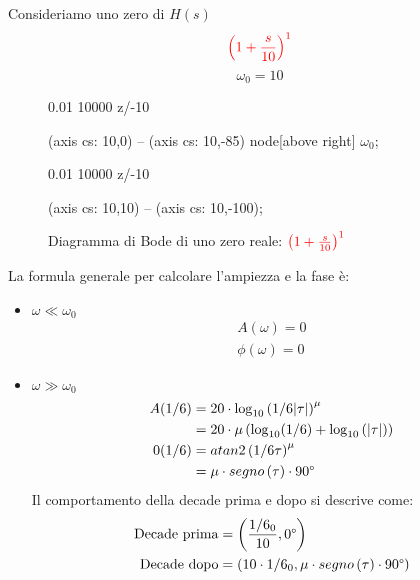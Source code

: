 \documentclass[a4paper]{article}
\begin{document}
\noindent
Consideriamo uno zero di \( H(s) \) 
\[
  \color{red} \left( 1 + \frac{s}{10} \right)^{1}
\] 
\[
\omega_0 = 10
\] 
\begin{figure}[H]
  \centering
  \begin{BodeMagPlot}[scale=1.5,ytick distance=20,ylabel={Ampiezza (dB)},xlabel={}] {0.01} {10000}
    {
      z/-10
    }

     (axis cs: 10,0) -- (axis cs: 10,-85) node[above right] {\( \omega_0 \)};
  \end{BodeMagPlot}

  \begin{BodePhPlot}[scale=1.5,ytick distance=45,ylabel={Fase (deg)},xlabel={Frequenza (rad/s)}] {0.01} {10000}
    {
      z/-10
    }

     (axis cs: 10,10) -- (axis cs: 10,-100);
  \end{BodePhPlot}
  \caption{Diagramma di Bode di uno zero reale: \( \color{red} \left( 1 + \frac{s}{10} \right)^{1} \) }
\end{figure}

\vspace{1em}
\noindent
La formula generale per calcolare l'ampiezza e la fase è:
\begin{itemize}
  \item \( \omega \ll \omega_0 \) 
    \[
    \begin{aligned}
      A(\omega) = 0\\
      \phi(\omega) = 0
    \end{aligned}
    \] 
  \item \( \omega \gg \omega_0 \) 
    \[
    \begin{aligned}
      A(1/6) &= 20 \cdot \log_{10} \left( 1/6 |\tau| \right)^{\mu}\\
                &= 20 \cdot \mu \left( \log_{10} (1/6) + \log_{10} \left( \left| \tau \right|  \right)  \right) \\
      0(1/6) &= atan2 \left( 1/6 \tau \right)^{\mu}\\
                   &= \mu \cdot segno \left( \tau \right) \cdot 90\degree
    \end{aligned}
    \] 
    Il comportamento della decade prima e dopo si descrive come:
    \[
      \begin{aligned}
        \text{Decade prima} &= \left( \frac{1/6_0}{10}, 0\degree \right) \\
        \text{Decade dopo} &= \left( 10 \cdot 1/6_0, \mu \cdot segno \left( \tau \right) \cdot 90\degree \right)
      \end{aligned}
    \] 
\end{itemize}
\end{document}
